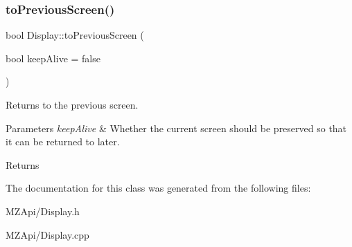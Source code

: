 \subsubsection{\texorpdfstring{to\+Previous\+Screen()}{toPreviousScreen()}}
{\footnotesize\ttfamily bool Display\+::to\+Previous\+Screen (\begin{DoxyParamCaption}\item[{bool}]{keep\+Alive = {\ttfamily false} }\end{DoxyParamCaption})}



Returns to the previous screen. 


\begin{DoxyParams}{Parameters}
{\em keep\+Alive} & Whether the current screen should be preserved so that it can be returned to later. \\
\hline
\end{DoxyParams}
\begin{DoxyReturn}{Returns}

\end{DoxyReturn}


The documentation for this class was generated from the following files\+:\begin{DoxyCompactItemize}
\item 
M\+Z\+Api/Display.\+h\item 
M\+Z\+Api/Display.\+cpp\end{DoxyCompactItemize}
